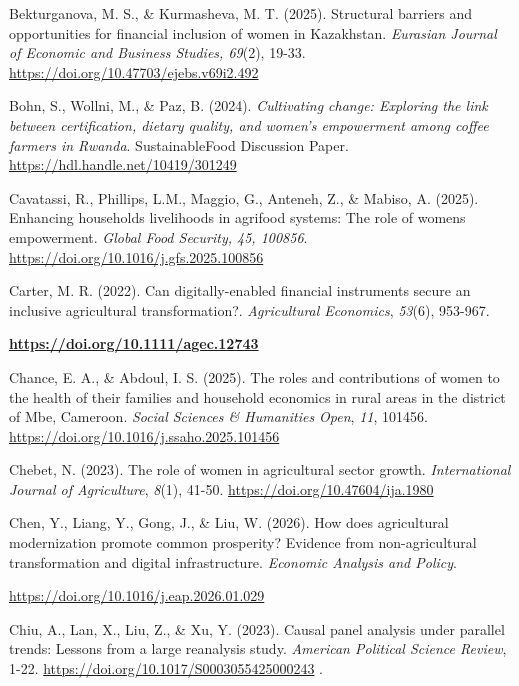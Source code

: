 ﻿\documentclass[sn-mathphys-num]{sn-jnl}
\newcommand{\hl}[1]{#1}
\begin{document}
\hl{Bekturganova, M. S., \& Kurmasheva, M. T. (2025). Structural
barriers and opportunities for financial inclusion of women in
Kazakhstan. \emph{Eurasian Journal of Economic and Business Studies,
69}(2), 19-33.}
\href{https://doi.org/10.47703/ejebs.v69i2.492}{\hl{https://doi.org/10.47703/ejebs.v69i2.492}}

\hl{Bohn, S., Wollni, M., \& Paz, B. (2024). \emph{Cultivating change:
Exploring the link between certification, dietary quality, and women's
empowerment among coffee farmers in Rwanda}. SustainableFood Discussion
Paper.}
\href{https://hdl.handle.net/10419/301249}{\hl{https://hdl.handle.net/10419/301249}}

\hl{Cavatassi, R., Phillips, L.M., Maggio, G., Anteneh, Z., \& Mabiso,
A. (2025). Enhancing households\textquotesingle{} livelihoods in
agrifood systems: The role of women\textquotesingle s empowerment.
\emph{Global Food Security, 45, 100856}.}
\href{https://doi.org/10.1016/j.gfs.2025.100856}{\hl{https://doi.org/10.1016/j.gfs.2025.100856}}

\hl{Carter, M. R. (2022). Can digitally-enabled financial instruments
secure an inclusive agricultural transformation?. \emph{Agricultural
Economics}, \emph{53}(6), 953-967.}

\href{https://doi.org/10.1111/agec.12743}{\textbf{\hl{https://doi.org/10.1111/agec.12743}}}

\hl{Chance, E. A., \& Abdoul, I. S. (2025). The roles and contributions
of women to the health of their families and household economics in
rural areas in the district of Mbe, Cameroon. \emph{Social Sciences \&
Humanities Open}, \emph{11}, 101456.}
\href{https://doi.org/10.1016/j.ssaho.2025.101456}{\hl{https://doi.org/10.1016/j.ssaho.2025.101456}}

\hl{Chebet, N. (2023). The role of women in agricultural sector growth.
\emph{International Journal of Agriculture}, \emph{8}(1), 41-50.}
\href{https://doi.org/10.47604/ija.1980}{\hl{https://doi.org/10.47604/ija.1980}}

\hl{Chen, Y., Liang, Y., Gong, J., \& Liu, W. (2026). How does
agricultural modernization promote common prosperity? Evidence from
non-agricultural transformation and digital infrastructure.
\emph{Economic Analysis and Policy}.}

\href{https://doi.org/10.1016/j.eap.2026.01.029}{\hl{https://doi.org/10.1016/j.eap.2026.01.029}}

\hl{Chiu, A., Lan, X., Liu, Z., \& Xu, Y. (2023). Causal panel analysis
under parallel trends: Lessons from a large reanalysis study.
\emph{American Political Science Review}, 1-22.}
\hl{\mbox{\url{https://doi.org/10.1017/S0003055425000243}} .}
\end{document}
